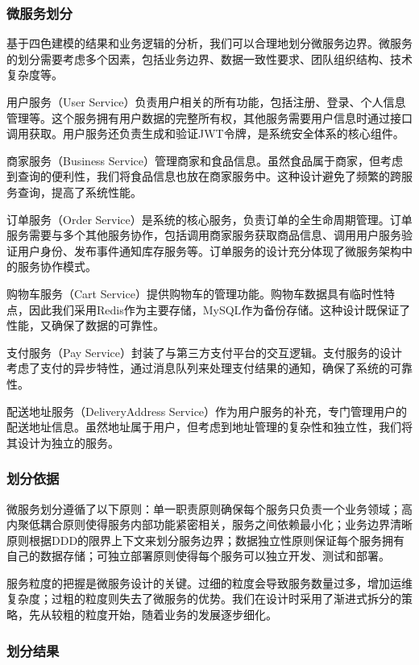 \documentclass[a4paper,12pt]{article}
\begin{document}
\subsubsection{微服务划分}

基于四色建模的结果和业务逻辑的分析，我们可以合理地划分微服务边界。微服务的划分需要考虑多个因素，包括业务边界、数据一致性要求、团队组织结构、技术复杂度等。

用户服务（User Service）负责用户相关的所有功能，包括注册、登录、个人信息管理等。这个服务拥有用户数据的完整所有权，其他服务需要用户信息时通过接口调用获取。用户服务还负责生成和验证JWT令牌，是系统安全体系的核心组件。

商家服务（Business Service）管理商家和食品信息。虽然食品属于商家，但考虑到查询的便利性，我们将食品信息也放在商家服务中。这种设计避免了频繁的跨服务查询，提高了系统性能。

订单服务（Order Service）是系统的核心服务，负责订单的全生命周期管理。订单服务需要与多个其他服务协作，包括调用商家服务获取商品信息、调用用户服务验证用户身份、发布事件通知库存服务等。订单服务的设计充分体现了微服务架构中的服务协作模式。

购物车服务（Cart Service）提供购物车的管理功能。购物车数据具有临时性特点，因此我们采用Redis作为主要存储，MySQL作为备份存储。这种设计既保证了性能，又确保了数据的可靠性。

支付服务（Pay Service）封装了与第三方支付平台的交互逻辑。支付服务的设计考虑了支付的异步特性，通过消息队列来处理支付结果的通知，确保了系统的可靠性。

配送地址服务（DeliveryAddress Service）作为用户服务的补充，专门管理用户的配送地址信息。虽然地址属于用户，但考虑到地址管理的复杂性和独立性，我们将其设计为独立的服务。

\subsubsection{划分依据}

微服务划分遵循了以下原则：单一职责原则确保每个服务只负责一个业务领域；高内聚低耦合原则使得服务内部功能紧密相关，服务之间依赖最小化；业务边界清晰原则根据DDD的限界上下文来划分服务边界；数据独立性原则保证每个服务拥有自己的数据存储；可独立部署原则使得每个服务可以独立开发、测试和部署。

服务粒度的把握是微服务设计的关键。过细的粒度会导致服务数量过多，增加运维复杂度；过粗的粒度则失去了微服务的优势。我们在设计时采用了渐进式拆分的策略，先从较粗的粒度开始，随着业务的发展逐步细化。

\subsubsection{划分结果}
\end{document}
